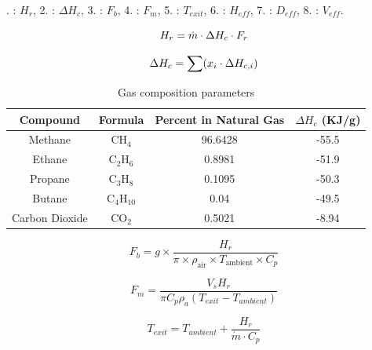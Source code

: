 . : $H_r$, 2. : $\Delta H_c$, 3. : $F_b$, 4. : $F_m$, 5. : $T_{exit}$, 6. : $H_{eff}$, 7. : $D_{eff}$, 8. : $V_{eff}$.


\begin{equation}
    \label{eq:heatRelease}
    H_{r} = \dot{m} \cdot \Delta H_{c} \cdot F_{r}
\end{equation}

\begin{equation}
    \label{eq:enthalpyChange}
    \Delta H_{c} = \sum (x_{i} \cdot \Delta H_{c,i})
\end{equation}



\begin{table}[h]
    \centering
    \caption{Gas composition parameters} 
    \label{tab:gas_composition}
    \begin{tabular}{|c|c|c|c|}
    \hline
    Compound & Formula & Percent in Natural Gas & \(\Delta H_c \) (KJ/g) \\ \hline
    Methane & CH\(_4\) & 96.6428 & -55.5 \\ \hline
    Ethane & C\(_2\)H\(_6\) & 0.8981 & -51.9 \\ \hline
    Propane & C\(_3\)H\(_8\) & 0.1095 & -50.3 \\ \hline
    Butane & C\(_4\)H\(_{10}\) & 0.04 & -49.5 \\ \hline
    Carbon Dioxide & CO\(_2\) & 0.5021 & -8.94 \\ \hline
    \end{tabular}
\end{table}



\begin{equation}
    F_b = g \times \frac{H_r}{\pi \times \rho_{\text{air}} \times T_{\text{ambient}} \times C_p} 
\end{equation}

\begin{equation}
    F_m = \frac{V_s H_r}{\pi C_p \rho_a (T_{exit} - T_{ambient})} 
\end{equation}



\begin{equation}
T_{exit} = T_{ambient} + \frac{H_r}{\dot{m} \cdot C_p}
\end{equation}


